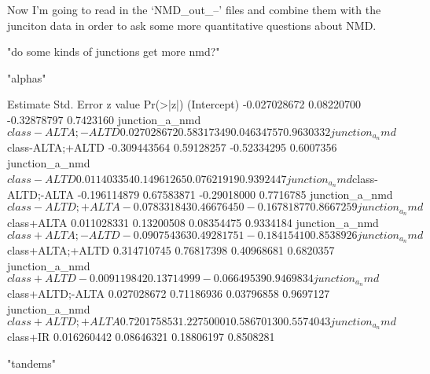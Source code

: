 \documentclass{article}
\begin{document}
Now I'm going to read in the `NMD\_out\_--' files and combine them with the junciton data in order to ask some more quantitative questions about NMD.

\begin{Schunk}
\begin{Soutput}
[1] "do some kinds of junctions get more nmd?"
\end{Soutput}
\begin{Soutput}
[1] "alphas"
\end{Soutput}
\begin{Soutput}
                                    Estimate Std. Error     z value  Pr(>|z|)
(Intercept)                     -0.027028672 0.08220700 -0.32878797 0.7423160
junction_a_nmd$class-ALTA;-ALTD  0.027028672 0.58317349  0.04634757 0.9630332
junction_a_nmd$class-ALTA;+ALTD -0.309443564 0.59128257 -0.52334295 0.6007356
junction_a_nmd$class-ALTD        0.011403354 0.14961265  0.07621919 0.9392447
junction_a_nmd$class-ALTD;-ALTA -0.196114879 0.67583871 -0.29018000 0.7716785
junction_a_nmd$class-ALTD;+ALTA -0.078331843 0.46676450 -0.16781877 0.8667259
junction_a_nmd$class+ALTA        0.011028331 0.13200508  0.08354475 0.9334184
junction_a_nmd$class+ALTA;-ALTD -0.090754363 0.49281751 -0.18415410 0.8538926
junction_a_nmd$class+ALTA;+ALTD  0.314710745 0.76817398  0.40968681 0.6820357
junction_a_nmd$class+ALTD       -0.009119842 0.13714999 -0.06649539 0.9469834
junction_a_nmd$class+ALTD;-ALTA  0.027028672 0.71186936  0.03796858 0.9697127
junction_a_nmd$class+ALTD;+ALTA  0.720175853 1.22750001  0.58670130 0.5574043
junction_a_nmd$class+IR          0.016260442 0.08646321  0.18806197 0.8508281
\end{Soutput}
\begin{Soutput}
[1] "tandems"
\end{Soutput}
\end{Schunk}
\end{document}
